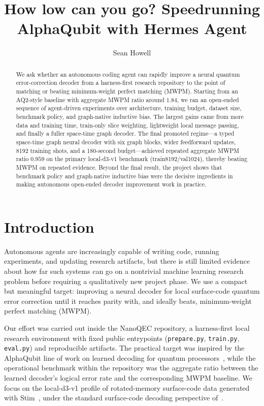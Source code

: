 \documentclass{article}
\title{How low can you go? Speedrunning AlphaQubit with Hermes Agent}
\author{Sean Howell}
\begin{document}
\maketitle

\begin{abstract}
We ask whether an autonomous coding agent can rapidly improve a neural quantum error-correction decoder from a harness-first research repository to the point of matching or beating minimum-weight perfect matching (MWPM). Starting from an AQ2-style baseline with aggregate MWPM ratio around $1.84$, we ran an open-ended sequence of agent-driven experiments over architecture, training budget, dataset size, benchmark policy, and graph-native inductive bias. The largest gains came from more data and training time, train-only slice weighting, lightweight local message passing, and finally a fuller space-time graph decoder. The final promoted regime---a typed space-time graph neural decoder with six graph blocks, wider feedforward updates, 8192 training shots, and a 180-second budget---achieved repeated aggregate MWPM ratio $0.959$ on the primary local-d3-v1 benchmark (train8192/val1024), thereby beating MWPM on repeated evidence. Beyond the final result, the project shows that benchmark policy and graph-native inductive bias were the decisive ingredients in making autonomous open-ended decoder improvement work in practice.
\end{abstract}

\section{Introduction}
Autonomous agents are increasingly capable of writing code, running experiments, and updating research artifacts, but there is still limited evidence about how far such systems can go on a nontrivial machine learning research problem before requiring a qualitatively new project phase. We use a compact but meaningful target: improving a neural decoder for local surface-code quantum error correction until it reaches parity with, and ideally beats, minimum-weight perfect matching (MWPM).

Our effort was carried out inside the NanoQEC repository, a harness-first local research environment with fixed public entrypoints (\texttt{prepare.py}, \texttt{train.py}, \texttt{eval.py}) and reproducible artifacts. The practical target was inspired by the AlphaQubit line of work on learned decoding for quantum processors~\citep{Bausch_2024}, while the operational benchmark within the repository was the aggregate ratio between the learned decoder's logical error rate and the corresponding MWPM baseline. We focus on the local-d3-v1 profile of rotated-memory surface-code data generated with Stim~\citep{Gidney_2021}, under the standard surface-code decoding perspective of~\citet{Fowler_2012}.
\end{document}
